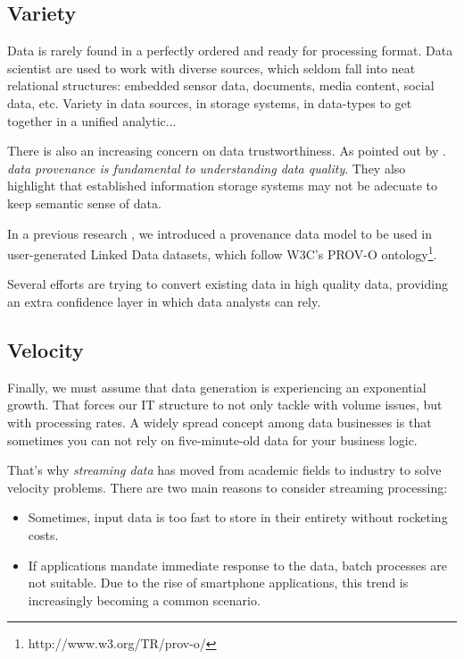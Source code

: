 \subsection{Variety}

Data is rarely found in a perfectly ordered and ready for processing format. Data scientist are used to work with diverse sources, which seldom fall into neat relational structures: embedded sensor data, documents, media content, social data, etc. Variety in data sources, in storage systems, in data-types to get together in a unified analytic...

There is also an increasing concern on data trustworthiness. As pointed out by \cite{buneman2013data}. \textit{data provenance is fundamental to understanding data quality}. They also highlight that established information storage systems may not be adecuate to keep semantic sense of data.

In a previous research \cite{emalditrust}, we introduced a provenance data model to be used in user-generated Linked Data datasets, which follow W3C's PROV-O ontology\footnote{http://www.w3.org/TR/prov-o/}.

Several efforts are trying to convert existing data in high quality data, providing an extra confidence layer in which data analysts can rely. 

\subsection{Velocity}

Finally, we must assume that data generation is experiencing an exponential growth. That forces our IT structure to not only tackle with volume issues, but with processing rates. A widely spread concept among data businesses is that sometimes you can not rely on five-minute-old data for your business logic.

That's why \textit{streaming data} has moved from academic fields to industry to solve velocity problems. There are two main reasons to consider streaming processing:
\begin{itemize}
	\item Sometimes, input data is too fast to store in their entirety without rocketing costs.
	\item If applications mandate immediate response to the data, batch processes are not suitable. Due to the rise of smartphone applications, this trend is increasingly becoming a common scenario.
\end{itemize}